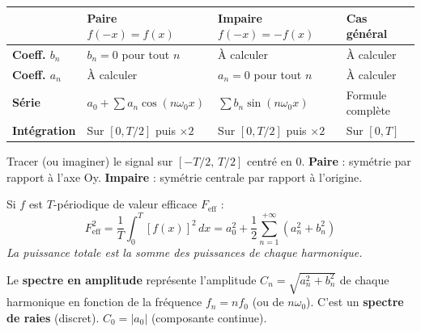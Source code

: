 \documentclass[a4paper,11pt]{article}
\newcommand{\w}{\omega_0}
\begin{document}
\vspace{0.2cm}

\begin{tcolorbox}[formulebox={3 — Parité et simplifications}]
\begin{center}
\renewcommand{\arraystretch}{1.7}
\begin{tabular}{>{\bfseries}m{2.8cm} m{4cm} m{4.2cm} m{3.2cm}}
\toprule
 & \textbf{Paire} $f(-x)=f(x)$ & \textbf{Impaire} $f(-x)=-f(x)$ & \textbf{Cas général} \\
\midrule
Coeff. $b_n$ & $b_n=0$ pour tout $n$ & À calculer & À calculer \\
Coeff. $a_n$ & À calculer & $a_n=0$ pour tout $n$ & À calculer \\
Série & $a_0+\sum a_n\cos(n\w x)$ & $\sum b_n\sin(n\w x)$ & Formule complète \\
Intégration & Sur $[0,T/2]$ puis $\times 2$ & Sur $[0,T/2]$ puis $\times 2$ & Sur $[0,T]$ \\
\bottomrule
\end{tabular}
\end{center}
\end{tcolorbox}

\begin{tcolorbox}[remarquebox={Méthode — Reconnaître la parité}]
Tracer (ou imaginer) le signal sur $[-T/2,\,T/2]$ centré en 0. \quad
\textbf{Paire} : symétrie par rapport à l'axe Oy. \quad
\textbf{Impaire} : symétrie centrale par rapport à l'origine.
\end{tcolorbox}

\vspace{0.2cm}

\begin{tcolorbox}[formulebox={4 — Théorème de Parseval — Valeur efficace}]
Si $f$ est $T$-périodique de valeur efficace $F_{\mathrm{eff}}$ :
\[
  \boxed{F_{\mathrm{eff}}^2 = \frac{1}{T}\int_0^T [f(x)]^2\,dx
  = a_0^2 + \frac{1}{2}\sum_{n=1}^{+\infty}\left(a_n^2+b_n^2\right)}
\]
\textit{La puissance totale est la somme des puissances de chaque harmonique.}
\end{tcolorbox}

\vspace{0.2cm}

\begin{tcolorbox}[formulebox={5 — Spectre en amplitude}]
Le \textbf{spectre en amplitude} représente l'amplitude $C_n = \sqrt{a_n^2+b_n^2}$ de chaque harmonique en fonction de la fréquence $f_n = n f_0$ (ou de $n\omega_0$). C'est un \textbf{spectre de raies} (discret).
\quad $C_0 = |a_0|$ (composante continue).
\end{tcolorbox}
\end{document}
